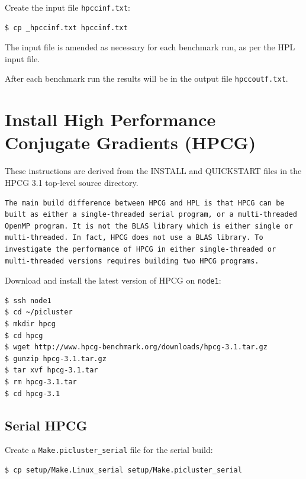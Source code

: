 \documentclass{report}
\begin{document}
Create the input file \verb|hpccinf.txt|:

\lstset{style=type}
\begin{lstlisting}
$ cp _hpccinf.txt hpccinf.txt
\end{lstlisting}

The input file is amended as necessary for each benchmark run, as per the HPL input file.

After each benchmark run the results will be in the output file \verb|hpccoutf.txt|.



%
%
\chapter{Install High Performance Conjugate Gradients (HPCG)}

These instructions are derived from the INSTALL and QUICKSTART files in the HPCG 3.1 top-level source directory.

\lstset{style=hack}
\begin{lstlisting}
The main build difference between HPCG and HPL is that HPCG can be built as either a single-threaded serial program, or a multi-threaded OpenMP program. It is not the BLAS library which is either single or multi-threaded. In fact, HPCG does not use a BLAS library. To investigate the performance of HPCG in either single-threaded or multi-threaded versions requires building two HPCG programs.
\end{lstlisting}

Download and install the latest version of HPCG on \verb|node1|:

\lstset{style=type}
\begin{lstlisting}
$ ssh node1
$ cd ~/picluster
$ mkdir hpcg
$ cd hpcg
$ wget http://www.hpcg-benchmark.org/downloads/hpcg-3.1.tar.gz
$ gunzip hpcg-3.1.tar.gz
$ tar xvf hpcg-3.1.tar
$ rm hpcg-3.1.tar
$ cd hpcg-3.1
\end{lstlisting}


%
%
\section{Serial HPCG}

Create a \verb|Make.picluster_serial| file for the serial build:

\lstset{style=type}
\begin{lstlisting}
$ cp setup/Make.Linux_serial setup/Make.picluster_serial
\end{lstlisting}
\end{document}
